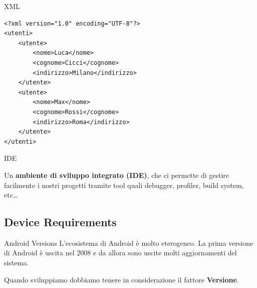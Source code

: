 \documentclass[xcolor=svgnames,11pt]{beamer}
\begin{document}
\begin{frame}[fragile]{XML}

\begin{lstlisting}
<?xml version="1.0" encoding="UTF-8"?>
<utenti>
    <utente>
        <nome>Luca</nome>
        <cognome>Cicci</cognome>
        <indirizzo>Milano</indirizzo>
    </utente>
    <utente>
        <nome>Max</nome>
        <cognome>Rossi</cognome>
        <indirizzo>Roma</indirizzo>
    </utente>
</utenti>
\end{lstlisting}

\end{frame}

\begin{frame}{IDE}

Un \textbf{ambiente di sviluppo integrato (IDE)}, che ci permette di gestire facilmente i nostri progetti tramite tool quali debugger, profiler, build system, etc\ldots

\pause
\begin{center}
\bigskip
{}
\end{center}

\end{frame}

\subsection{Device Requirements}

\begin{frame}{Android Versions}
L'ecosistema di Android \`e molto eterogeneo. La prima versione di Android \`e uscita nel 2008 e da allora sono uscite molti aggiornamenti del sistema.

\medskip

\begin{center}


\end{center}

\pause
\medskip

Quando sviluppiamo dobbiamo tenere in considerazione il fattore \textbf{Versione}.
\end{frame}
\end{document}
